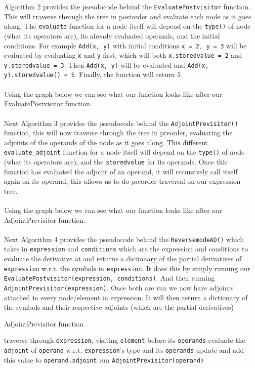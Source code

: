 \documentclass{article}
\begin{document}
Algorithm 2 provides the pseudocode behind the \verb|EvaluatePostvisitor| function. This will traverse through the tree in postorder and evaluate each node as it goes along. The \verb|evaluate| function for a node itself will depend on the \verb|type()| of node (what its operators are), its already evaluated operands, and the initial conditions. For example \verb|Add(x, y)| with initial conditions \verb|x = 2, y = 3| will be evaluated by evaluating \verb|x| and \verb|y| first, which will both \verb|x.storedvalue = 2| and \verb|y.storedvalue = 3|. Then \verb|Add(x, y)| will be evaluated and \verb|Add(x, y).storedvalue() = 5|. Finally, the function will return $5$
\\\\
Using the graph below we can see what our function looks like after our EvaluatePostvisitor function.
\\\\
Next Algorithm 3 provides the pseudocode behind the \verb|AdjointPrevisitor()| function, this will now traverse through the tree in preorder, evaluating the adjoints of the operands of the node as it goes along. This different \verb|evaluate_adjoint| function for a node itself will depend on the \verb|type()| of node (what its operators are), and the \verb|storedvalue| for its operands. Once this function has evaluated the adjoint of an operand, it will recursively call itself again on its operand, this allows us to do preorder traversal on our expression tree.
\\\\
Using the graph below we can see what our function looks like after our AdjointPrevisitor function.
\\\\
Next Algorithm 4 provides the pseudocode behind the \verb|ReversemodeAD()| which takes in \verb|expression| and \verb|conditions| which are the expression and conditions to evaluate the derivative at and returns a dictionary of the partial derivatives of \verb|expression| w.r.t. the symbols in \verb|expression|. It does this by simply running our \verb|EvaluatePostvisitor(expression, conditions)|. And then running \verb|AdjointPrevisitor(expression)|. Once both are run we now have adjoints attached to every node/element in expression. It will then return a dictionary of the symbols and their respective adjoints (which are the partial derivatives)



\begin{algorithm}
\caption{AdjointPrevisitor function}\label{AdjointPrevisitor}
\begin{algorithmic}[1]
\State traverse through \verb|expression|, visiting \verb|element| before its \verb|operands|
\State evaluate the \verb|adjoint| of \verb|operand| w.r.t. \verb|expression|'s type and its \verb|operands|
\State update and add this value to \verb|operand.adjoint|
\State run \verb|AdjointPrevisitor(operand)|
\EndFor
\EndProcedure
\end{algorithmic}
\end{algorithm}
\end{document}
